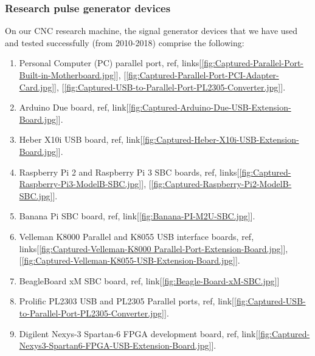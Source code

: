 \subsubsection{Research pulse generator devices}

On our CNC research machine, the signal generator devices that we have used and tested successfully (from 2010-2018) comprise the following:
	 
	\begin{enumerate}
		\item Personal Computer (PC) parallel port, ref\cite{FYP_Abzal_2012}, links[\ref{fig:Captured-Parallel-Port-Built-in-Motherboard.jpg}], [\ref{fig:Captured-Parallel-Port-PCI-Adapter-Card.jpg}], [\ref{fig:Captured-USB-to-Parallel-Port-PL2305-Converter.jpg}].
		
		\item Arduino Due board, ref\cite{FYP_Hazmi_2014}, link[\ref{fig:Captured-Arduino-Due-USB-Extension-Board.jpg}].
		
		
		\item Heber X10i USB board, ref\cite{FYP_Saleh_2014}, link[\ref{fig:Captured-Heber-X10i-USB-Extension-Board.jpg}]. 
		
		
		\item Raspberry Pi 2 and Raspberry Pi 3 SBC boards, ref\cite{FYP_Asyrul_2017}, links[\ref{fig:Captured-Raspberry-Pi3-ModelB-SBC.jpg}], [\ref{fig:Captured-Raspberry-Pi2-ModelB-SBC.jpg}].
		
		 
		\item Banana Pi SBC board, ref\cite{FYP_Rajeef_2015}, link[\ref{fig:Banana-PI-M2U-SBC.jpg}].
		
		
		\item Velleman K8000 Parallel and K8055 USB interface boards, ref\cite{FYP_Abzal_2012}, links[\ref{fig:Captured-Velleman-K8000 Parallel-Port-Extension-Board.jpg}],
		[\ref{fig:Captured-Velleman-K8055-USB-Extension-Board.jpg}].
		
		\item BeagleBoard xM SBC board, ref\cite{FYP_Rajeef_2015}, link[\ref{fig:Beagle-Board-xM-SBC.jpg}]
		
		\item Prolific PL2303 USB and PL2305 Parallel ports, ref\cite{FYP_Abzal_2012}, link[\ref{fig:Captured-USB-to-Parallel-Port-PL2305-Converter.jpg}].
		
		\item Digilent Nexys-3 Spartan-6 FPGA development board, ref\cite{FYP_Charles_2014}, link[\ref{fig:Captured-Nexys3-Spartan6-FPGA-USB-Extension-Board.jpg}].
		
	\end{enumerate}
	
